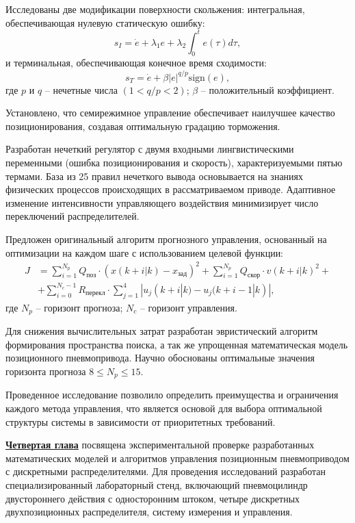 Исследованы две модификации поверхности скольжения: интегральная, обеспечивающая нулевую статическую ошибку:
\begin{equation}
	s_I = \dot{e} + \lambda_1 e + \lambda_2 \int_0^t e(\tau)d\tau,
\end{equation}
и терминальная, обеспечивающая конечное время сходимости:
\begin{equation}
	s_T = \dot{e} + \beta |e|^{q/p} \text{sign}(e),
\end{equation}
где $p$ и $q$ -- нечетные числа $(1 < q/p < 2)$; $\beta$ -- положительный коэффициент.

Установлено, что семирежимное управление обеспечивает наилучшее качество
позиционирования, создавая оптимальную градацию торможения.

Разработан нечеткий регулятор с двумя входными
лингвистическими переменными (ошибка позиционирования и скорость), характеризуемыми
пятью термами. База из 25 правил нечеткого вывода основывается на
знаниях физических процессов происходящих в рассматриваемом приводе.
Адаптивное изменение интенсивности
управляющего воздействия минимизирует число переключений распределителей.

Предложен оригинальный алгоритм прогнозного управления, основанный
на оптимизации на каждом шаге с использованием целевой функции:
\begin{equation}
	\begin{aligned}
		J & = \sum_{i=1}^{N_p} Q_{\text{поз}} \cdot (x(k+i|k) - x_{\text{зад}})^2 + \sum_{i=1}^{N_p} Q_{\text{скор}} \cdot v(k+i|k)^2 + \\
		  & + \sum_{i=0}^{N_c-1} R_{\text{перекл}} \cdot \sum_{j=1}^{4} |u_j(k+i|k) - u_j(k+i-1|k)|,
	\end{aligned}
\end{equation}
где $N_p$ -- горизонт прогноза; $N_c$ -- горизонт управления.

Для снижения вычислительных затрат разработан эвристический
алгоритм формирования пространства поиска, а так же упрощенная математическая модель позиционного пневмопривода.
Научно обоснованы оптимальные
значения горизонта прогноза $8 \leq N_p \leq 15$.

Проведенное исследование позволило определить преимущества и
ограничения каждого метода управления, что является основой для
выбора оптимальной структуры системы в зависимости от приоритетных требований.

\underline{\textbf{Четвертая глава}}
посвящена экспериментальной проверке разработанных математических моделей и алгоритмов
управления позиционным пневмоприводом с дискретными распределителями. Для проведения исследований
разработан специализированный лабораторный стенд, включающий пневмоцилиндр двустороннего действия с
односторонним штоком, четыре дискретных двухпозиционных распределителя, систему измерения и управления.

